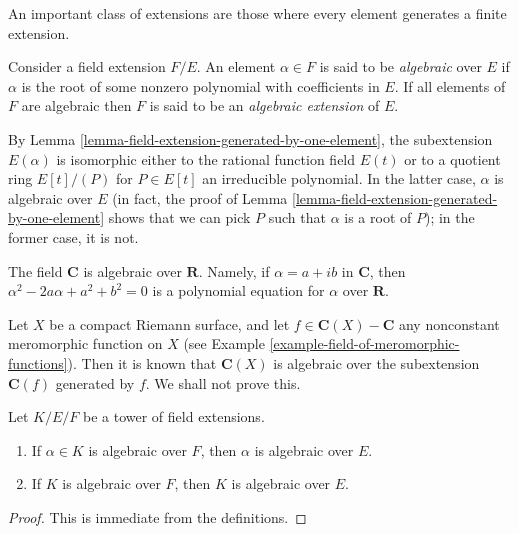 \noindent
An important class of extensions are those where every element generates
a finite extension.

\begin{definition}
\label{definition-algebraic}
Consider a field extension $F/E$. An element $\alpha \in F$ is said to be
{\it algebraic} over $E$ if $\alpha$ is the root of some nonzero polynomial
with coefficients in $E$. If all elements of $F$ are algebraic then $F$ is
said to be an {\it algebraic extension} of $E$.
\end{definition}

\noindent
By Lemma \ref{lemma-field-extension-generated-by-one-element}, the
subextension $E(\alpha)$ is isomorphic either to the rational function
field $E(t)$ or to a quotient ring $E[t]/(P)$ for $P \in E[t]$ an
irreducible polynomial. In the latter case, $\alpha$ is algebraic over
$E$ (in fact, the proof of
Lemma \ref{lemma-field-extension-generated-by-one-element}
shows that we can pick $P$ such that $\alpha$ is a root of $P$);
in the former case, it is not.

\begin{example}
\label{example-C-algebraic-over-R}
The field $\mathbf{C}$ is algebraic over $\mathbf{R}$. Namely, if
$\alpha = a + ib$ in $\mathbf{C}$, then $\alpha^2 - 2a\alpha + a^2 + b^2 = 0$
is a polynomial equation for $\alpha$ over $\mathbf{R}$.
\end{example}

\begin{example}
\label{example-compact-riemann-surface-is-finite-over-P1}
Let $X$ be a compact Riemann surface, and let
$f \in \mathbf{C}(X) - \mathbf{C}$ any nonconstant meromorphic function
on $X$ (see Example \ref{example-field-of-meromorphic-functions}). Then it is
known that $\mathbf{C}(X)$ is algebraic over the subextension
$\mathbf{C}(f)$ generated by $f$. We shall not prove this.
\end{example}

\begin{lemma}
\label{lemma-algebraic-goes-up}
Let $K/E/F$ be a tower of field extensions.
\begin{enumerate}
\item If $\alpha \in K$ is algebraic over $F$, then $\alpha$ is algebraic
over $E$.
\item If $K$ is algebraic over $F$, then $K$ is algebraic over $E$.
\end{enumerate}
\end{lemma}

\begin{proof}
This is immediate from the definitions.
\end{proof}

